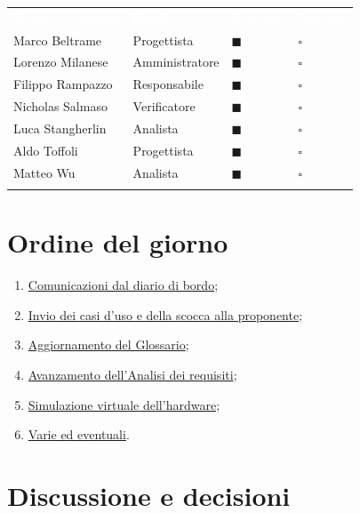 \documentclass[12pt,a4paper]{article}
\newcommand{\vnum}{10}                     %
\newcommand{\thc}[1]{\textcolor{white}{\textbf{#1}}}              %
\newcommand{\rl}{\arrayrulecolor{bfline}\hline}                   %
\newcommand{\presente}{$\blacksquare$ & $\square$}                %
\newcommand{\assente}{$\square$ & $\blacksquare$}
\newcommand{\tightlist}{\setlength{\itemsep}{1pt}\setlength{\parskip}{0pt}}
\begin{document}
\begin{center}
\begin{tabularx}{\linewidth}{>{\raggedright\arraybackslash}X>{\centering\arraybackslash}X>{\centering\arraybackslash}p{2.2cm}>{\centering\arraybackslash}p{2.2cm}}
\rowcolor{bfblue}\thc{Nome e cognome} & \thc{Ruolo} & \thc{Presente} & \thc{Assente} \\
Marco Beltrame & Progettista & \presente \\ \rl
Lorenzo Milanese & Amministratore & \presente \\ \rl
Filippo Rampazzo & Responsabile & \presente \\ \rl
Nicholas Salmaso & Verificatore & \presente \\ \rl
Luca Stangherlin & Analista & \presente \\ \rl
Aldo Toffoli & Progettista & \presente \\ \rl
Matteo Wu & Analista & \presente \\ \rl
\end{tabularx}
\end{center}

\hypertarget{ordine-del-giorno}{%
\section{Ordine del giorno}}

\begin{enumerate}
\tightlist
\item \hyperlink{odg-1}{Comunicazioni dal diario di bordo};
\item \hyperlink{odg-2}{Invio dei casi d'uso e della scocca alla proponente};
\item \hyperlink{odg-3}{Aggiornamento del Glossario};
\item \hyperlink{odg-4}{Avanzamento dell'Analisi dei requisiti};
\item \hyperlink{odg-5}{Simulazione virtuale dell'hardware};
\item \hyperlink{varie-ed-eventuali}{Varie ed eventuali}.
\end{enumerate}
\newpage

\hypertarget{discussione-e-decisioni}{%
\section{Discussione e decisioni}}
\end{document}
